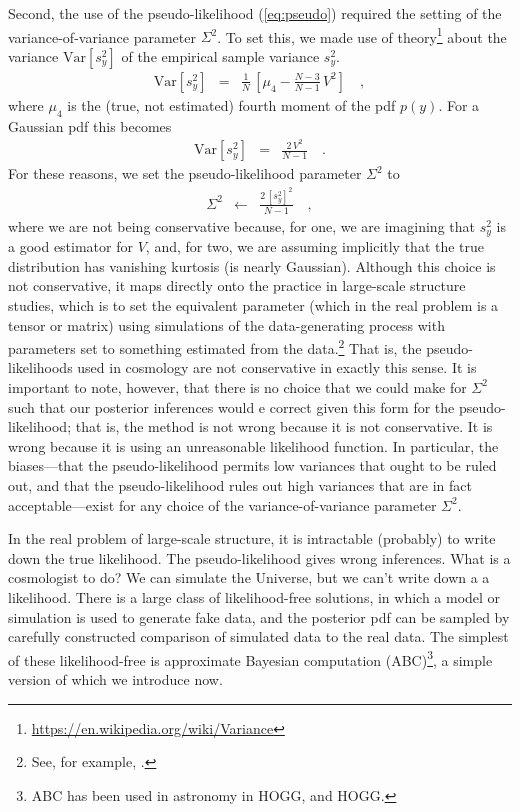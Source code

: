 \documentclass[12pt, letterpaper, preprint]{aastex}
\newcommand{\Var}{\mathrm{Var}}
\begin{document}
Second, the use of the pseudo-likelihood (\ref{eq:pseudo}) required
the setting of the variance-of-variance parameter $\Sigma^2$.
To set this, we made use of theory\footnote{\url{https://en.wikipedia.org/wiki/Variance}}
about the variance $\Var[s^2_y]$ of
the empirical sample variance $s^2_y$.
\begin{eqnarray}
\Var[s^2_y] &=& \frac{1}{N}\,\left[\mu_4 - \frac{N-3}{N-1}\,V^2\right]
\quad ,
\end{eqnarray}
where $\mu_4$ is the (true, not estimated) fourth moment of the pdf $p(y)$.
For a Gaussian pdf this becomes
\begin{eqnarray}
\Var[s^2_y] &=& \frac{2\,V^2}{N-1}
\quad .
\end{eqnarray}
For these reasons, we set the pseudo-likelihood parameter $\Sigma^2$ to
\begin{eqnarray}
\Sigma^2 &\leftarrow& \frac{2\,[s^2_y]^2}{N-1}
\quad ,
\end{eqnarray}
where we are not being conservative because, for one, we are imagining
that $s^2_y$ is a good estimator for $V$, and, for two, we are
assuming implicitly that the true distribution has vanishing kurtosis
(is nearly Gaussian).
Although this choice is not conservative, it maps directly onto the
practice in large-scale structure studies, which is to set the
equivalent parameter (which in the real problem is a tensor or matrix)
using simulations of the data-generating process with parameters set
to something estimated from the data.\footnote{See, for example, \cite{percival}.}
That is, the pseudo-likelihoods used in cosmology are not conservative
in exactly this sense.
It is important to note, however, that there is no choice that we
could make for $\Sigma^2$ such that our posterior inferences would e
correct given this form for the pseudo-likelihood; that is, the method
is not wrong because it is not conservative. It is wrong because it
is using an unreasonable likelihood function.
In particular, the biases---that the pseudo-likelihood permits low
variances that ought to be ruled out, and that the pseudo-likelihood
rules out high variances that are in fact acceptable---exist for any
choice of the variance-of-variance parameter $\Sigma^2$.

In the real problem of large-scale structure, it is intractable (probably) to 
write down the true likelihood.
The pseudo-likelihood gives wrong inferences.
What is a cosmologist to do?
We can simulate the Universe, but we can't write down a a likelihood.
There is a large class of likelihood-free solutions, in which a model
or simulation is used to generate fake data, and the posterior pdf can
be sampled by carefully constructed comparison of simulated data to
the real data.
The simplest of these likelihood-free is approximate Bayesian
computation (ABC)\footnote{ABC has been used in astronomy in HOGG, and
  HOGG.}, a simple version of which we introduce now.
\end{document}
